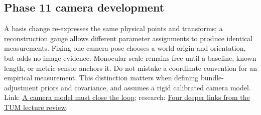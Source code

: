 \subsection{Phase 11 camera development}\label{appendix-1bae9457dbc3-phase-11-camera-development}

A basis change re-expresses the same physical points and transforms; a reconstruction gauge allows different parameter assignments to produce identical measurements. Fixing one camera pose chooses a world origin and orientation, but adds no image evidence. Monocular scale remains free until a baseline, known length, or metric sensor anchors it. Do not mistake a coordinate convention for an empirical measurement. This distinction matters when defining bundle-adjustment priors and covariance, and assumes a rigid calibrated camera model. Link: \hyperref[02-foundations-ii-ch037-a-camera-model-must-close-the-loop]{A camera model must close the loop}; research: \hyperref[02-foundations-ii-ch036-four-deeper-links-from-the-tum-lecture-review]{Four deeper links from the TUM lecture review}.
